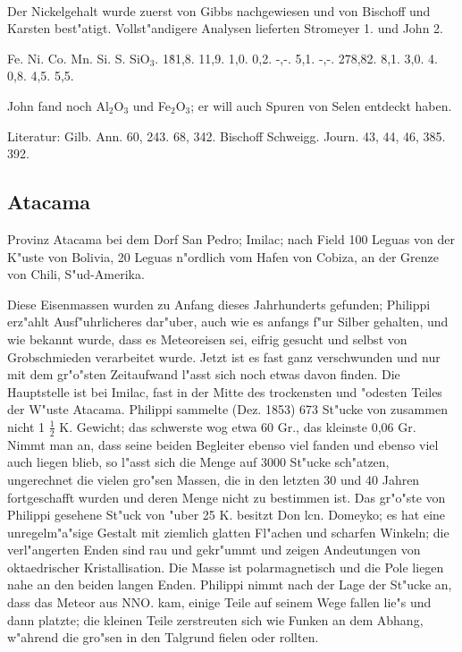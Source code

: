 \documentclass[a4paper, 11pt, oneside]{article}
\begin{document}
\paragraph{}
Der Nickelgehalt wurde zuerst von Gibbs nachgewiesen und von Bischoff und Karsten best"atigt. Vollst"andigere Analysen lieferten Stromeyer 1. und John 2.

Fe. Ni. Co. Mn. Si. S. SiO$_{3}$.  
1\. 81,8. 11,9. 1,0. 0,2. -,-. 5,1. -,-.  
2\. 78,82. 8,1. 3,0. 4. 0,8. 4,5. 5,5.

John fand noch Al$_{2}$O$_{3}$ und Fe$_{2}$O$_{3}$; er will auch Spuren von Selen entdeckt haben.

Literatur: Gilb. Ann. 60, 243. 68, 342. Bischoff Schweigg. Journ. 43, 44, 46, 385. 392.

\subsection{Atacama}

Provinz Atacama bei dem Dorf San Pedro; Imilac; nach Field 100 Leguas von der K"uste von Bolivia, 20 Leguas n"ordlich vom Hafen von Cobiza, an der Grenze von Chili, S"ud-Amerika.

Diese Eisenmassen wurden zu Anfang dieses Jahrhunderts gefunden; Philippi erz"ahlt Ausf"uhrlicheres dar"uber, auch wie es anfangs f"ur Silber gehalten, und wie bekannt wurde, dass es Meteoreisen sei, eifrig gesucht und selbst von Grobschmieden verarbeitet wurde. Jetzt ist es fast ganz verschwunden und nur mit dem gr"o"sten Zeitaufwand l"asst sich noch etwas davon finden. Die Hauptstelle ist bei Imilac, fast in der Mitte des trockensten und "odesten Teiles der W"uste Atacama. Philippi sammelte (Dez. 1853) 673 St"ucke von zusammen nicht 1 $\frac{1}{2}$ K. Gewicht; das schwerste wog etwa 60 Gr., das kleinste 0,06 Gr. Nimmt man an, dass seine beiden Begleiter ebenso viel fanden und ebenso viel auch liegen blieb, so l"asst sich die Menge auf 3000 St"ucke sch"atzen, ungerechnet die vielen gro"sen Massen, die in den letzten 30 und 40 Jahren fortgeschafft wurden und deren Menge nicht zu bestimmen ist. Das gr"o"ste von Philippi gesehene St"uck von "uber 25 K. besitzt Don lcn. Domeyko; es hat eine unregelm"a"sige Gestalt mit ziemlich glatten Fl"achen und scharfen Winkeln; die verl"angerten Enden sind rau und gekr"ummt und zeigen Andeutungen von oktaedrischer Kristallisation. Die Masse ist polarmagnetisch und die Pole liegen nahe an den beiden langen Enden. Philippi nimmt nach der Lage der St"ucke an, dass das Meteor aus NNO. kam, einige Teile auf seinem Wege fallen lie"s und dann platzte; die kleinen Teile zerstreuten sich wie Funken an dem Abhang, w"ahrend die gro"sen in den Talgrund fielen oder rollten.
\end{document}
